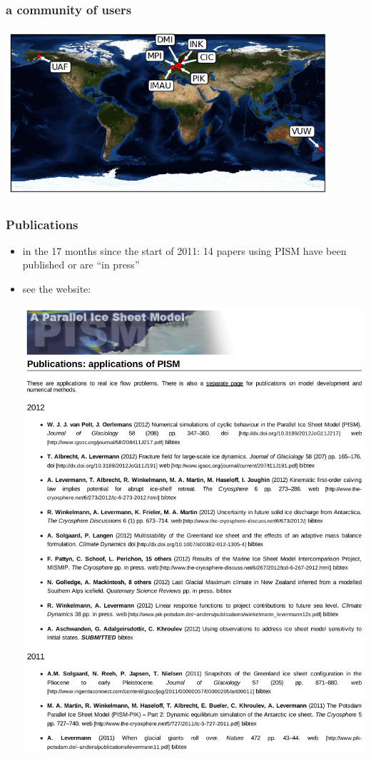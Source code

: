 \documentclass[hide notes,intlimits]{beamer}
\begin{document}
\begin{frame}
  \frametitle{a community of users}
 \begin{center}
    \includegraphics[width=120mm]{pism-users-map.png}
  \end{center}
\end{frame}


\begin{frame}
  \frametitle{Publications}

  \begin{itemize}
  \item in the 17 months since the start of 2011: \alert{14 papers} using PISM have been published or are ``in press''
  \item see the website:
    \begin{center}
    \includegraphics[height=0.65\textheight]{publications}
    \end{center}
  \end{itemize}
\end{frame}
\end{document}
